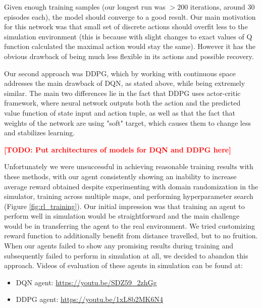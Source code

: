 \documentclass{article}
\newcommand\todo[1]{\textcolor{red}{\textbf{[TODO: #1]}}}
\begin{document}
Given enough training samples (our longest run was $>200$ iterations, around 30 episodes each), the model should converge to a good result. Our main motivation for this network was that small set of discrete actions should overfit less to the simulation environment (this is because with slight changes to exact values of Q function calculated the maximal action would stay the same). However it has the obvious drawback of being much less flexible in its actions and possible recovery.

Our second approach was DDPG, which by working with continuous space addresses the main drawback of DQN, as stated above, while being extremely similar. The main two differences lie in the fact that DDPG uses actor-critic framework, where neural network outputs both the action and the predicted value function of state input and action tuple, as well as that the fact that weights of the network are using "soft" target, which causes them to change less and stabilizes learning.

\todo{Put architectures of models for DQN and DDPG here}

Unfortunately we were unsuccessful in achieving reasonable training results with these methods, with our agent consistently showing an inability to increase average reward obtained despite experimenting with domain randomization in the simulator, training across multiple maps, and performing hyperparameter search (Figure \ref{fig:rl_training}). Our initial impression was that training an agent to perform well in simulation would be straightforward and the main challenge would be in transferring the agent to the real environment. We tried customizing reward function to additionally benefit from distance travelled, but to no fruition. When our agents failed to show any promising results during training and subsequently failed to perform in simulation at all, we decided to abandon this approach. Videos of evaluation of these agents in simulation can be found at:
\begin{itemize}
    \item DQN agent: \url{https://youtu.be/SDZ59_2zhGg}
    \item DDPG agent: \url{https://youtu.be/1xL8b2MK6N4}
\end{itemize}
\end{document}
